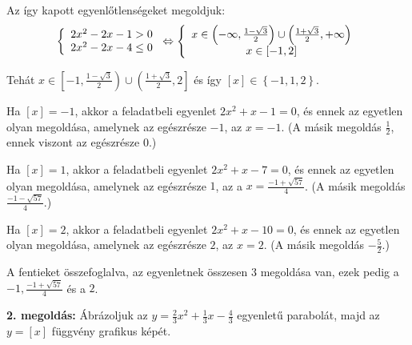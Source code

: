 \documentclass[a4paper,10pt]{article}
\begin{document}
Az így kapott egyenlőtlenségeket megoldjuk:
\[
\left\{
\begin{array}
[c]{c}%
2x^{2}-2x-1>0\\
2x^{2}-2x-4\leq0
\end{array}
\right.  \Leftrightarrow\left\{
\begin{array}
[c]{c}%
x\in\left(  -\infty,\frac{1-\sqrt{3}}{2}\right)  \cup\left(  \frac{1+\sqrt{3}%
}{2},+\infty\right) \\
x\in\left[  -1,2\right]
\end{array}
\right.  \]

Tehát $x\in\left[ -1,\frac{1-\sqrt{3}}{2}\right) \cup\left(
\frac{1+\sqrt{3}}{2},2\right]$ és így $\left[  x\right]
\in\left\{  -1,1,2\right\}  $.

Ha $\left[  x\right]  =-1$, akkor a feladatbeli egyenlet
$2x^{2}+x-1=0$, és ennek az egyetlen olyan megoldása,
amelynek az egészrésze $-1$, az $x=-1$. (A másik
megoldás $\frac{1}{2}$, ennek viszont az egészrésze
$0$.)

Ha $\left[  x\right]  =1$, akkor a feladatbeli egyenlet
$2x^{2}+x-7=0$, és ennek az egyetlen olyan megoldása,
amelynek az egészrésze $1$, az a $x=\frac{-1+\sqrt{57}}{4}$.
(A másik megoldás $\frac {-1-\sqrt{57}}{4}$.)

Ha $\left[  x\right]  =2$, akkor a feladatbeli egyenlet
$2x^{2}+x-10=0$, és ennek az egyetlen olyan megoldása,
amelynek az egészrésze $2$, az $x=2$. (A másik
megoldás $-\frac{5}{2}$.)

A fentieket összefoglalva, az egyenletnek összesen $3$
megoldása van, ezek pedig a $-1,\frac{-1+\sqrt{57}}{4}$ és a
$2$.

\medskip

{\bf 2. megoldás: } 
Ábrázoljuk az $y=\frac{2}{3}x^{2}+\frac{1}{3}x-\frac{4}{3}$
egyenletű parabolát, majd az $y=\left[  x\right]  $
függvény grafikus képét.
\end{document}

